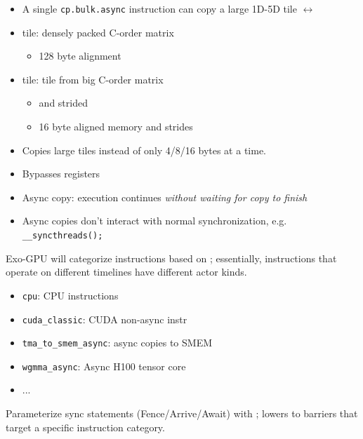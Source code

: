 \begin{minipage}[t]{0.48\textwidth}\fixminipage
\begin{itemize}
\item A single \texttt{cp.bulk.async} instruction can copy a large 1D-5D tile $\leftrightarrow$
\item {} tile: densely packed C-order matrix
\begin{itemize}
  \item 128 byte alignment
\end{itemize}
\item {} tile: tile from big C-order matrix
\begin{itemize}
  \item {} and strided
  \item 16 byte aligned memory and strides
\end{itemize}
\end{itemize}

\end{minipage}
\hfill
\begin{minipage}[t]{0.48\textwidth}\fixminipage
{}
\begin{itemize}
  \item Copies large tiles instead of only 4/8/16 bytes at a time.
  \item Bypasses registers
  \item Async copy: execution continues \textit{without waiting for copy to finish}
  \item Async copies don't interact with normal synchronization, e.g. \texttt{\_\_syncthreads();}
\end{itemize}


Exo-GPU will categorize instructions based on ; essentially, instructions that operate on different timelines have different actor kinds.
\begin{itemize}
  \item \texttt{cpu}: CPU instructions
  \item \texttt{cuda\_classic}: CUDA non-async instr
  \item \texttt{tma\_to\_smem\_async}: async copies to SMEM
  \item \texttt{wgmma\_async}: Async H100 tensor core
  \item ...
\end{itemize}
Parameterize sync statements (Fence/Arrive/Await) with ; lowers to barriers that target a specific instruction category.
\end{minipage}

